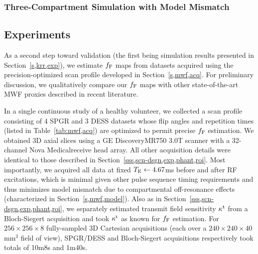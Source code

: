 \subsubsection{Three-Compartment Simulation with Model Mismatch}
\label{sss,mwf,exp,sim,3comp}

\subsection{\Invivo Experiments}
\label{ss,mwf,exp,invivo}

As a second step toward validation
(the first being simulation results 
presented in Section~\ref{s,krr,exp}),
we estimate $f_{\mathrm{F}}$ maps
from \invivo datasets acquired
using the precision-optimized scan profile
developed in Section~\ref{s,mwf,acq}.
For preliminary discussion,
we qualitatively compare our $f_{\mathrm{F}}$ maps 
with other state-of-the-art MWF proxies
described in recent literature.

In a single continuous study
of a healthy volunteer,
we collected a scan profile 
consisting of $4$ SPGR and $3$ DESS datasets
whose flip angles and repetition times
(listed in Table~\ref{tab:mwf,acq}) 
are optimized 
to permit precise $f_{\mathrm{F}}$ estimation. 
We obtained 3D axial slices 
using a GE Discovery\tmark MR750 3.0T scanner
with a 32-channel Nova Medical\regis receive head array.
All other acquisition details were identical
to those described in Section~\ref{sss,scn-dsgn,exp,phant,roi}.
Most importantly,
we acquired all data 
at fixed $T_\mathrm{E} \gets 4.67$ms
before and after RF excitations,
which is minimal
given other pulse sequence timing requirements
and thus minimizes model mismatch 
due to compartmental off-resonance effects
(characterized in Section~\ref{s,mwf,model}).
Also as in Section~\ref{sss,scn-dsgn,exp,phant,roi},
we separately estimated
transmit field sensitivity $\kappa^{\mathrm{t}}$
from a Bloch-Siegert acquisition \cite{sacolick:10:bmb}
and took $\kappa^{\mathrm{t}}$ as known
for $f_{\mathrm{F}}$ estimation.
For $256\times256\times8$ fully-sampled 3D Cartesian acquisitions
(each over a $240\times240\times40$mm$^3$ field of view),
SPGR/DESS and Bloch-Siegert acquisitions respectively took totals
of 10m8s and 1m40s. 

